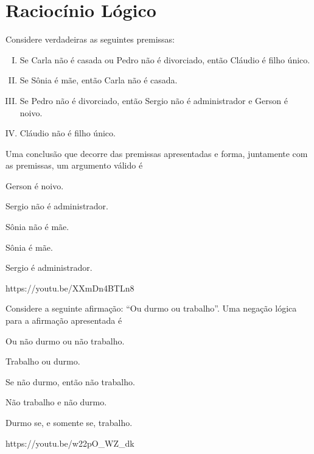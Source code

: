 \chapter{Raciocínio Lógico}


{Considere verdadeiras as seguintes premissas:
\begin{enumerate}[I.]
\item Se Carla não é casada ou Pedro não é divorciado, então Cláudio é filho único.
\item Se Sônia é mãe, então Carla não é casada.
\item Se Pedro não é divorciado, então Sergio não é administrador e Gerson é noivo.
\item Cláudio não é filho único.
\end{enumerate}
Uma conclusão que decorre das premissas apresentadas
e forma, juntamente com as premissas, um argumento
válido é
}{\item Gerson é noivo.
\item Sergio não é administrador.
\item Sônia não é mãe.
\item Sônia é mãe.
\item Sergio é administrador.}
{https://youtu.be/XXmDn4BTLn8}

{Considere a seguinte afirmação: “Ou durmo ou trabalho”.
Uma negação lógica para a afirmação apresentada é}{
\item Ou não durmo ou não trabalho.
\item Trabalho ou durmo.
\item Se não durmo, então não trabalho.
\item Não trabalho e não durmo.
\item Durmo se, e somente se, trabalho.}
{https://youtu.be/w22pO_WZ_dk}

